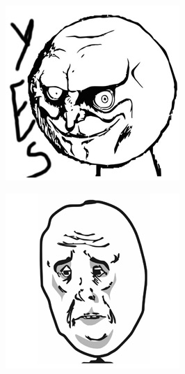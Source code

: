 \begin{multicols}{8}
\begin{center}
\includegraphics[width=\linewidth]{./IMG-GIT/MEMES/Meme-Faces-1.jpg}   
\end{center}

\begin{center}
\includegraphics[width=\linewidth]{./IMG-GIT/MEMES/Meme-Faces-2.jpg}  
\end{center}


\end{multicols}
